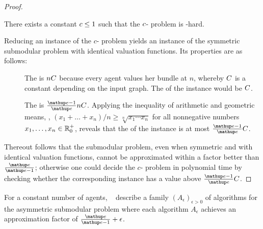 \begin{proof}
	\begin{proposition}
		There exists a constant \(c \le 1\) such that the \(c\)-\Gap{} problem is \NP-hard.
	\end{proposition}
	Reducing an instance of the \(c\)-\Gap{} problem yields an instance of the symmetric submodular \USW{} problem with identical valuation functions.
	Its properties are as follows:
	\begin{description}
		\item[\Yes]
		The \USW{} is \(n C\) because every agent values her bundle at \(n\), whereby \(C\) is a constant depending on the input graph.
		The \NSW{} of the instance would be \(C\).

		\item[\No]
		The \USW{} is \(\frac{\euler - 1}{\euler} n \USWconstant\).
		Applying the inequality of arithmetic and geometric means, \ie{}, \((x_1 + \dots + x_n)/n \ge \sqrt[n]{x_1 \dotsm x_n}\) for all nonnegative numbers \(x_1, \dots, x_n \in \realposzero\), reveals that the \NSW{} of the instance is at most \(\frac{\euler - 1}{\euler} \USWconstant\).
	\end{description}
	Thereout follows that the submodular \NSW{} problem, even when symmetric and with identical valuation functions, cannot be approximated within a factor better than \(\frac{\euler}{\euler - 1}\);
	otherwise one could decide the \(c\)-\Gap{} problem in polynomial time by checking whether the corresponding \NSW{} instance has a value above \(\frac{\euler - 1}{\euler} \USWconstant\).
\end{proof}

For a constant number of agents, \citeauthor{APNSWuSVþUM}~\cite[Section 5.1]{APNSWuSVþUM} describe a family \((A_{\epsilon})_{\epsilon > 0}\) of algorithms for the asymmetric submodular \NSW{} problem where each algorithm \(A_\epsilon\) achieves an approximation factor of \(\frac{\euler}{\euler - 1} + \epsilon\).

